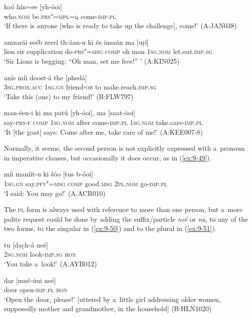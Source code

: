 \begin{exe}
\ex
\label{ex:9-45}
\gll koó hín=ee [yh-óoi]  \\
who.\textsc{nom} be.\textsc{prs"=mpl=q} come-\textsc{imp.pl}  \\
\glt `If there is anyone [who is ready to take up the challenge], come!' (A:JAN038)

\ex
\label{ex:9-46}
\gll amzarái seéb zeerí th-áan-u ki ée insaán ma [uṛí] \\
lion sir supplication do-\textsc{prs"=msg} \textsc{comp} oh  man \textsc{1sg.nom} let.out.\textsc{imp.sg} \\
\glt `Sir Lions is begging: ``Oh man, set me free!'' ' (A:KIN025)

\ex
\label{ex:9-47}
\gll anís míi doost-á the [phedá] \\
\textsc{3sg.prox.acc} \textsc{1sg.gn} friend-\textsc{ob} to make.reach.\textsc{imp.sg} \\
\glt `Take this (one) to my friend!' (B:FLW797)

\ex
\label{ex:9-48}
\gll man-éen-i ki ma patú [yh-óoi], ma [saat-óoi] \\
say-\textsc{prs-f} \textsc{comp} \textsc{1sg.nom} after come-\textsc{imp.pl} \textsc{1sg.nom} take.care-\textsc{imp.pl} \\
\glt `It [the goat] says: Come after me, take care of me!' (A:KEE007-8)
\end{exe}

Normally, it seems, the second person is not explicitly expressed with a~pronoun in imperative clauses, but occasionally it does occur, as in (\ref{ex:9-49}).

\begin{exe}
\ex
\label{ex:9-49}
\gll míi maníit-u ki šóo [tus b-óoi] \\
\textsc{1sg.gn} say.\textsc{pfv"=msg} \textsc{comp} good.\textsc{msg} \textsc{2pl.nom} go-\textsc{imp.pl} \\
\glt `I said: You may go!' (A:ACR010)
\end{exe}

The \textsc{pl} form is always used with reference to more than one person, but a~more polite request could be done by adding the suffix/particle \textit{neé} or \textit{na}, to any of the two forms, to the singular in (\ref{ex:9-50}) and to the plural in (\ref{ex:9-51}).

\begin{exe}
\ex
\label{ex:9-50}
\gll tu [dac̣h-á neé] \\
\textsc{2sg.nom} look-\textsc{imp.sg} \textsc{hon}  \\
\glt `You take a~look!' (A:AYB012)

\ex
\label{ex:9-51}
\gll dar [muč-úui neé] \\
door open-\textsc{imp.pl} \textsc{hon} \\
\glt `Open the door, please!' [uttered by a~little girl addressing older women, supposedly mother and grandmother, in the household] (B:HLN1020)
\end{exe}


